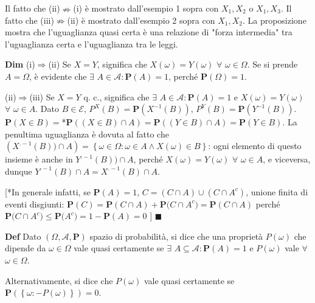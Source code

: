 \documentclass{article}
\begin{document}
Il fatto che (ii)$\nRightarrow $(i) \`{e} mostrato dall'esempio 1 sopra con $%
X_{1},X_{2}$ o $X_{1},X_{3}$. Il fatto che (iii)$\nRightarrow $(ii) \`{e}
mostrato dall'esempio 2 sopra con $X_{1},X_{2}$. La proposizione mostra che
l'uguaglianza quasi certa \`{e} una relazione di "forza intermedia" tra
l'uguaglianza certa e l'uguaglianza tra le leggi.

\textbf{Dim} (i)$\Longrightarrow $(ii) Se $X=Y$, significa che $X\left(
\omega \right) =Y\left( \omega \right) $ $\forall $ $\omega \in \Omega $. Se
si prende $A=\Omega $, \`{e} evidente che $\exists $ $A\in \mathcal{A}:%
\mathbf{P}\left( A\right) =1$, perch\'{e} $\mathbf{P}\left( \Omega \right)
=1 $.

(ii)$\Longrightarrow $(iii) Se $X=Y$ q. c., significa che $\exists $ $A\in 
\mathcal{A}:\mathbf{P}\left( A\right) =1$ e $X\left( \omega \right) =Y\left(
\omega \right) $ $\forall $ $\omega \in A$. Dato $B\in \mathcal{E}$, $%
P^{X}\left( B\right) =\mathbf{P}\left( X^{-1}\left( B\right) \right) $, $%
P^{Y}\left( B\right) =\mathbf{P}\left( Y^{-1}\left( B\right) \right) $. $%
\mathbf{P}\left( X\in B\right) =$*$\mathbf{P}\left( \left( X\in B\right)
\cap A\right) =\mathbf{P}\left( \left( Y\in B\right) \cap A\right) =\mathbf{P%
}\left( Y\in B\right) $. La penultima uguaglianza \`{e} dovuta al fatto che $%
\left( X^{.-1}\left( B\right) )\cap A\right) =\left\{ \omega \in \Omega
:\omega \in A\wedge X\left( \omega \right) \in B\right\} $: ogni elemento di
questo insieme \`{e} anche in $Y^{.-1}\left( B\right) )\cap A$, perch\'{e} $%
X\left( \omega \right) =Y\left( \omega \right) $ $\forall $ $\omega \in A$,
e viceversa, dunque $Y^{.-1}\left( B\right) \cap A=X^{.-1}\left( B\right)
\cap A$.

[*In generale infatti, se $\mathbf{P}\left( A\right) =1$, $C=\left( C\cap
A\right) \cup \left( C\cap A^{c}\right) $, unione finita di eventi
disgiunti: $\mathbf{P}\left( C\right) =\mathbf{P}\left( C\cap A\right) +%
\mathbf{P(}C\cap A^{c})=\mathbf{P}\left( C\cap A\right) $ perch\'{e} $%
\mathbf{P(}C\cap A^{c})\leq \mathbf{P(}A^{c})=1-\mathbf{P}\left( A\right) =0$%
] $\blacksquare $

\textbf{Def} Dato $\left( \Omega ,\mathcal{A},\mathbf{P}\right) $ spazio di
probabilit\`{a}, si dice che una propriet\`{a} $P\left( \omega \right) $ che
dipende da $\omega \in \Omega $ vale quasi certamente se $\exists $ $%
A\subseteq \mathcal{A}:\mathbf{P}\left( A\right) =1$ e $P\left( \omega
\right) $ vale $\forall $ $\omega \in \Omega $.

Alternativamente, si dice che $P\left( \omega \right) $ vale quasi
certamente se $\mathbf{P}\left( \left\{ \omega :-P\left( \omega \right)
\right\} \right) =0$.
\end{document}
